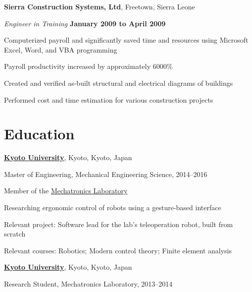 \documentclass[10pt, a4paper]{article}
\begin{document}
\halfblankline

\textbf{Sierra Construction Systems, Ltd}, Freetown, Sierra Leone

\begin{outerlist}
\item[] \textit{Engineer in Training} \hfill \textbf{January 2009 to April 2009}
\begin{innerlist}
  \item Computerized payroll and significantly saved time and resources using Microsoft Excel, Word, and VBA programming
  \item Payroll productivity increased by approximately 6000\%
  \item Created and verified as-built structural and electrical diagrams of buildings
  \item Performed cost and time estimation for various construction projects
\end{innerlist}
\end{outerlist}

\section{Education}
\href{http://www.kyoto-u.ac.jp/}{\textbf{Kyoto University}}, Kyoto, Kyoto, Japan
\begin{outerlist}
\item[] Master of Engineering, Mechanical Engineering Science, 2014--2016
  \begin{innerlist}
    \item Member of the \href{www.mechatronics.me.kyoto-u.ac.jp}{Mechatronics Laboratory}
    \item Researching ergonomic control of robots using a gesture-based interface
    \item Relevant project: Software lead for the lab's teleoperation robot, built from scratch
    \item Relevant courses:
	    Robotics;
	    Modern control theory;
	    Finite element analysis
  \end{innerlist}
\end{outerlist}

\halfblankline

\href{http://www.kyoto-u.ac.jp/}{\textbf{Kyoto University}}, Kyoto, Kyoto, Japan
\begin{outerlist}
\item[] Research Student, Mechatronics Laboratory, 2013--2014
\end{outerlist}
\end{document}

